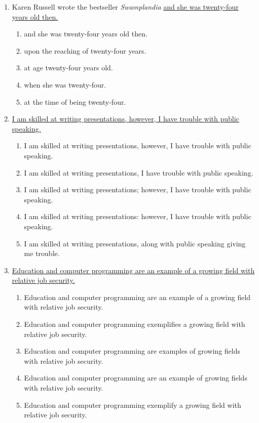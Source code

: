 \documentclass[12pt]{book}
\begin{document}
\begin{enumerate}
\bigskip
\item Karen Russell wrote the bestseller \textit{Swamplandia} \underline{and she was twenty-four years old then.}
\begin{enumerate}[label=(\Alph*)]
\item and she was twenty-four years old then.
\item upon the reaching of twenty-four years.
\item at age twenty-four years old.
\item when she was twenty-four.
\item at the time of being twenty-four.
\end{enumerate}

\bigskip
\item \underline{I am skilled at writing presentations, however, I have trouble with public speaking.}
\begin{enumerate}[label=(\Alph*)]
\item I am skilled at writing presentations, however, I have trouble with public speaking.
\item I am skilled at writing presentations, I have trouble with public speaking.
\item I am skilled at writing presentations; however, I have trouble with public speaking.
\item I am skilled at writing presentations: however, I have trouble with public speaking.
\item I am skilled at writing presentations, along with public speaking giving me trouble.
\end{enumerate}

\newpage
\item \ul{Education and computer programming are an example of a growing field with relative job security.}
\begin{enumerate}[label=(\Alph*)]
\item Education and computer programming are an example of a growing field with relative job security.
\item Education and computer programming exemplifies a growing field with relative job security.
\item Education and computer programming are examples of growing fields with relative job security.
\item Education and computer programming are an example of growing fields with relative job security. 
\item Education and computer programming exemplify a growing field with relative job security.
\end{enumerate}


\end{enumerate}
\end{document}
